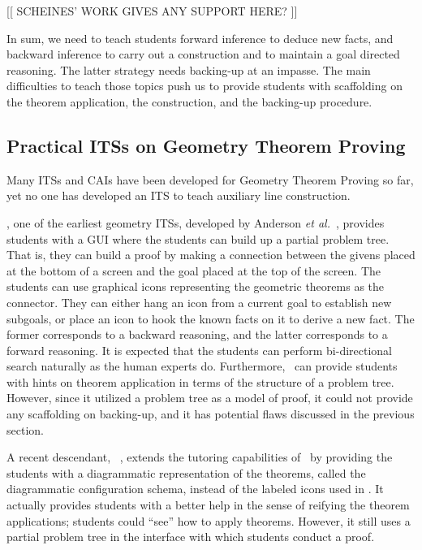 [[ SCHEINES' WORK GIVES ANY SUPPORT HERE? ]]  \cite{Scheines94}

In sum, we need to teach students forward inference to deduce new facts,
and backward inference to carry out a construction and to maintain a
goal directed reasoning.  The latter strategy needs backing-up at an
impasse.  The main difficulties to teach those topics push us to provide
students with scaffolding on the theorem application, the construction,
and the backing-up procedure.

\subsection{Practical ITSs on Geometry Theorem Proving}

Many ITSs and CAIs have been developed for Geometry Theorem Proving so
far, yet no one has developed an ITS to teach auxiliary line
construction.  

\GeometryTutor, one of the earliest geometry ITSs, developed by Anderson
\textit{et al.}~\cite{Anderson85}, provides students with a GUI where
the students can build up a partial problem tree.  That is, they can
build a proof by making a connection between the givens placed at the
bottom of a screen and the goal placed at the top of the screen.  The
students can use graphical icons representing the geometric theorems as
the connector.  They can either hang an icon from a current goal to
establish new subgoals, or place an icon to hook the known facts on it
to derive a new fact.  The former corresponds to a backward reasoning,
and the latter corresponds to a forward reasoning.  It is expected that
the students can perform bi-directional search naturally as the human
experts do.  Furthermore, \GeometryTutor\ can provide students with
hints on theorem application in terms of the structure of a problem
tree.  However, since it utilized a problem tree as a model of proof, it
could not provide any scaffolding on backing-up, and it has potential
flaws discussed in the previous section.

A recent descendant, \Angle\ \cite{Koedinger93}, extends the tutoring
capabilities of \GeometryTutor\ by providing the students with a
diagrammatic representation of the theorems, called the diagrammatic
configuration schema, instead of the labeled icons used in
\GeometryTutor.  It actually provides students with a better help in the
sense of reifying the theorem applications; students could ``see'' how
to apply theorems.  However, it still uses a partial problem tree in the
interface with which students conduct a proof.

